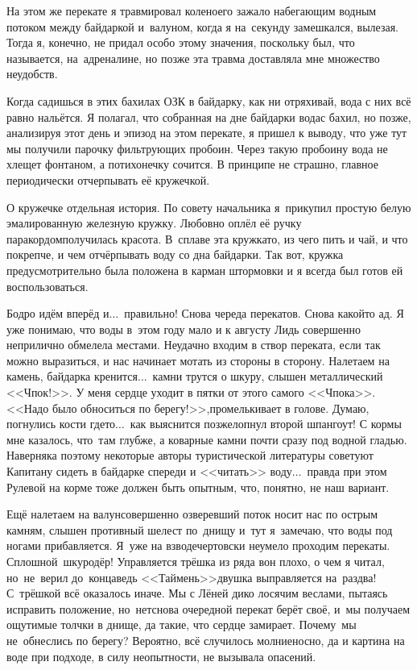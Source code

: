 На этом же перекате я травмировал колено\mdash его зажало набегающим водным потоком между байдаркой и~валуном, когда я на~секунду замешкался, вылезая. Тогда я, конечно, не придал особо этому значения, поскольку был, что называется, на~адреналине, но позже эта травма доставляла мне множество неудобств.

Когда садишься в этих бахилах ОЗК в байдарку, как ни отряхивай, вода с них всё равно нальётся. Я полагал, что собранная на дне байдарки вода\mdash с бахил, но позже, анализируя этот день и эпизод на этом перекате, я пришел к выводу, что уже тут мы получили парочку фильтрующих пробоин. Через такую пробоину вода не хлещет фонтаном, а потихонечку сочится. В принципе не страшно, главное периодически отчерпывать её кружечкой.

О кружечке отдельная история. По совету начальника я~прикупил простую белую эмалированную железную кружку. Любовно оплёл её ручку паракордом\mdash получилась красота. В~сплаве эта кружка\mdash то, из чего пить и чай, и что покрепче, и чем отчёрпывать воду со дна байдарки. Так вот, кружка предусмотрительно была положена в карман штормовки и я всегда был готов ей воспользоваться.

Бодро идём вперёд и$\ldots$~правильно! Снова череда перекатов. Снова какой\sdash то ад. Я уже понимаю, что воды в~этом году мало и к августу Лидь совершенно неприлично обмелела местами. Неудачно входим в створ переката, если так можно выразиться, и нас начинает мотать из стороны в сторону. Налетаем на камень, байдарка кренится$\ldots$~камни трутся о шкуру, слышен металлический <<Чпок!>>. У меня сердце уходит в пятки от этого самого <<Чпока>>. <<Надо было обноситься по берегу!>>,\mdash промелькивает в голове. Думаю, погнулись кости где\sdash то$\ldots$~как выяснится позже\mdash лопнул второй шпангоут! С кормы мне казалось, что~там глубже, а коварные камни почти сразу под водной гладью. Наверняка поэтому некоторые авторы туристической литературы советуют Капитану сидеть в байдарке спереди и <<читать>> воду$\ldots$~правда при этом Рулевой на корме тоже должен быть опытным, что, понятно, не наш вариант.

Ещё налетаем на валун\mdash совершенно озверевший поток носит нас по острым камням, слышен противный шелест по~днищу и~тут я~замечаю, что воды под ногами прибавляется. Я~уже на взводе\mdash чертовски неумело проходим перекаты. Сплошной~шкуродёр! Управляется трёшка из ряда вон плохо, о чем я читал, но~не~верил до~конца\mdash ведь <<Таймень>>\sdash двушка выправляется на~раз\sdash два! С~трёшкой всё оказалось иначе. Мы с Лёней дико лосячим веслами, пытаясь исправить положение, но~нет\mdash снова очередной перекат берёт своё, и~мы получаем ощутимые толчки в днище, да такие, что сердце замирает. Почему~мы не~обнеслись по берегу? Вероятно, всё случилось молниеносно, да и картина на воде при подходе, в силу неопытности, не вызывала опасений.

